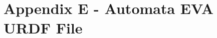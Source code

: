 \newpage
\section{Appendix E - Automata EVA URDF File}\label{evaURDF}
\inputminted[fontsize=\footnotesize,baselinestretch=1, linenos]{xml}{appendices/automataEVA.urdf}